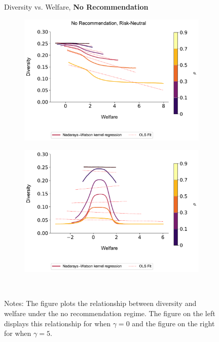 \documentclass[format=acmsmall, review=false]{acmart}
\begin{document}
\addtocounter{figure}{-1}
\begin{figure}[ht]
\caption{Diversity vs. Welfare, \textbf{No Recommendation}}
\begin{subfigure}{.45\textwidth}
\includegraphics[width=1.0\linewidth]{figures/diversity_welfare_rn_n_200.pdf}
\end{subfigure}
\begin{subfigure}{.45\textwidth}
\includegraphics[width=1.0\linewidth]{figures/diversity_welfare_ra_n_200.pdf}
\end{subfigure}\\
\caption*{\scriptsize Notes: The figure plots the relationship between diversity and welfare under the no recommendation regime. The figure on the left displays this relationship for when $\gamma = 0$ and the figure on the right for when $\gamma = 5$.}\label{fig:diversity_welfare_ra}
\end{figure}
\end{document}
